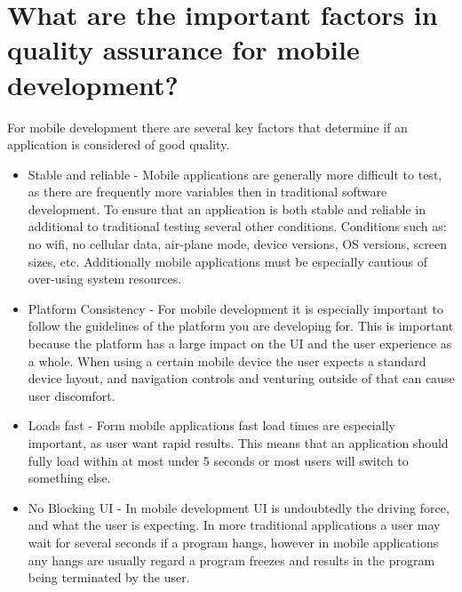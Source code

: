 \documentclass{article}
\begin{document}
	\section*{What are the important factors in quality assurance for mobile development?}
		For mobile development there are several key factors that determine if an application is considered of good quality.
		\begin{itemize}
			\item Stable and reliable - Mobile applications are generally more difficult to test, as there are frequently more variables then in traditional software development. To ensure that an application is both stable and reliable in additional to traditional testing several other conditions. Conditions such as: no wifi, no cellular data, air-plane mode, device versions, OS versions, screen sizes, etc. Additionally mobile applications must be especially cautious of over-using system resources.
			\item Platform Consistency - For mobile development it is especially important to follow the guidelines of the platform you are developing for. This is important because the platform has a large impact on the UI and the user experience as a whole. When using a certain mobile device the user expects a standard device layout, and navigation controls and venturing outside of that can cause user discomfort.
			\item Loads fast - Form mobile applications fast load times are especially important, as user want rapid results. This means that an application should fully load within at most under 5 seconds or most users will switch to something else.
			\item No Blocking UI - In mobile development UI is undoubtedly the driving force, and what the user is expecting. In more traditional applications a user may wait for several seconds if a program hangs, however in mobile applications any hangs are usually regard a program freezes and results in the program being terminated by the user.
		\end{itemize}
\end{document}
